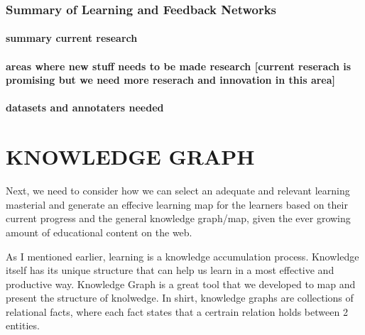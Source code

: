 \documentclass[]{book}
\theoremstyle{definition}
\theoremstyle{definition}
\theoremstyle{definition}
\theoremstyle{remark}
\begin{document}
\subsection{Summary of Learning and Feedback
Networks}\label{summary-of-learning-and-feedback-networks}

\subsubsection{summary current research}\label{summary-current-research}

\subsubsection{areas where new stuff needs to be made research
{[}current reserach is promising but we need more reserach and
innovation in this
area{]}}\label{areas-where-new-stuff-needs-to-be-made-research-current-reserach-is-promising-but-we-need-more-reserach-and-innovation-in-this-area}

\subsubsection{datasets and annotaters
needed}\label{datasets-and-annotaters-needed}

\chapter{KNOWLEDGE GRAPH}\label{knowledge-graph}

Next, we need to consider how we can select an adequate and relevant
learning masterial and generate an effecive learning map for the
learners based on their current progress and the general knowledge
graph/map, given the ever growing amount of educational content on the
web.

As I mentioned earlier, learning is a knowledge accumulation process.
Knowledge itself has its unique structure that can help us learn in a
most effective and productive way. Knowledge Graph is a great tool that
we developed to map and present the structure of knolwedge. In shirt,
knowledge graphs are collections of relational facts, where each fact
states that a certrain relation holds between 2 entities.
\end{document}
